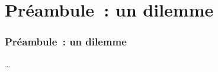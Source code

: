 \documentclass[xcolor=table]{beamer}
\begin{document}
\section{Préambule~: un dilemme}
\begin{frame}
\frametitle{Préambule~: un dilemme}

\pause
…
\end{frame}
\end{document}
